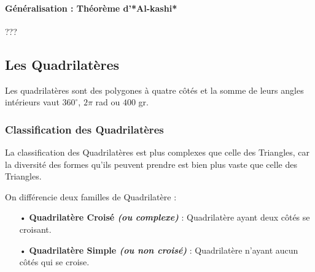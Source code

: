 \documentclass[a4paper, twoside]{article}
\begin{document}










\paragraph*{Généralisation : Théorème d'*Al-kashi*}
???


\newpage

\subsection{Les Quadrilatères} \label{quadrilateres}

Les quadrilatères sont des polygones à quatre côtés et la somme de leurs angles
intérieurs vaut $360^\circ$, $2 \pi$ rad ou $400$ gr.

\subsubsection{Classification des Quadrilatères}

La classification des Quadrilatères est plus complexes que celle
des Triangles, car la diversité des formes qu'ils peuvent prendre
est bien plus vaste que celle des Triangles.

\medbreak

On différencie deux familles de Quadrilatère :

\begin{itemize}
	\item[•] \textbf{Quadrilatère Croisé \textit{(ou complexe)}} : Quadrilatère ayant deux côtés se croisant.
	\item[•] \textbf{Quadrilatère Simple \textit{(ou non croisé)}} : Quadrilatère n'ayant aucun côtés qui se croise.
\end{itemize}
\end{document}

